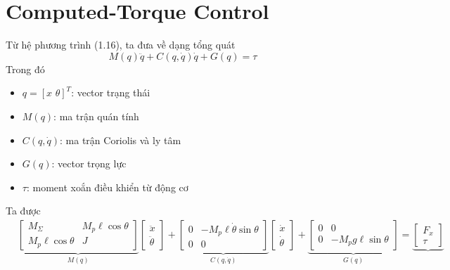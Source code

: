     \section{Computed-Torque Control}
            Từ hệ phương trình (1.16), ta đưa về dạng tổng quát
            \begin{equation}
                M(q) \ddot{q} + C (q, \dot{q}) \dot{q} + G(q) = \tau
            \end{equation}
            Trong đó
            \begin{itemize}
                \item $q = [x \,\, \theta]^T$: vector trạng thái
                \item $M(q)$: ma trận quán tính
                \item $C(q, \dot{q})$: ma trận Coriolis và ly tâm
                \item $G(q)$: vector trọng lực
                \item $\tau$: moment xoắn điều khiển từ động cơ
            \end{itemize} 
            Ta được
            \begin{align*}
                &\underbrace{
                \begin{bmatrix}
                M_\Sigma & M_p \ell \cos \theta\\
                M_p \ell  \cos \theta & J
                \end{bmatrix}
                }_{M(q)}
                \begin{bmatrix}
                \ddot{x} \\ \ddot{\theta}
                \end{bmatrix}
                +
                \underbrace{
                \begin{bmatrix}
                0 & -M_p \ell \dot{\theta} \sin \theta \\
                0 & 0
                \end{bmatrix}
                }_{C(q, \dot{q})}
                \begin{bmatrix}
                \dot{x} \\ \dot{\theta}
                \end{bmatrix} 
                +
                \underbrace{
                \begin{bmatrix}
                0 & 0 \\
                0 & -M_p g \ell \sin \theta
                \end{bmatrix}
                }_{G(q)}
                =
                \underbrace{
                \begin{bmatrix}
                F_x \\
                \tau
                \end{bmatrix}
                }
            \end{align*}

